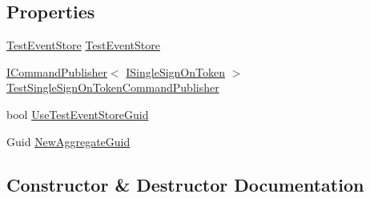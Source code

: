 \subsection*{Properties}
\begin{DoxyCompactItemize}
\item 
\hyperlink{classCqrs_1_1Tests_1_1Substitutes_1_1TestEventStore}{Test\+Event\+Store} \hyperlink{classCqrs_1_1Tests_1_1Substitutes_1_1TestDependencyResolver_a1102f66163e9313777a41fff54aa5a75_a1102f66163e9313777a41fff54aa5a75}{Test\+Event\+Store}
\item 
\hyperlink{interfaceCqrs_1_1Commands_1_1ICommandPublisher}{I\+Command\+Publisher}$<$ \hyperlink{interfaceCqrs_1_1Authentication_1_1ISingleSignOnToken}{I\+Single\+Sign\+On\+Token} $>$ \hyperlink{classCqrs_1_1Tests_1_1Substitutes_1_1TestDependencyResolver_a41f52b962e9f15a0d06834022182f760_a41f52b962e9f15a0d06834022182f760}{Test\+Single\+Sign\+On\+Token\+Command\+Publisher}
\item 
bool \hyperlink{classCqrs_1_1Tests_1_1Substitutes_1_1TestDependencyResolver_a000d2ee924b6f60bc77174495ad9ca89_a000d2ee924b6f60bc77174495ad9ca89}{Use\+Test\+Event\+Store\+Guid}
\item 
Guid \hyperlink{classCqrs_1_1Tests_1_1Substitutes_1_1TestDependencyResolver_a8df7ff7fb6f8bd3b2da43fadd46f1cf8_a8df7ff7fb6f8bd3b2da43fadd46f1cf8}{New\+Aggregate\+Guid}
\end{DoxyCompactItemize}


\subsection{Constructor \& Destructor Documentation}
\mbox{\label{classCqrs_1_1Tests_1_1Substitutes_1_1TestDependencyResolver_ad2c04971107ccbd80aa3f5c0440438cb_ad2c04971107ccbd80aa3f5c0440438cb}} 

